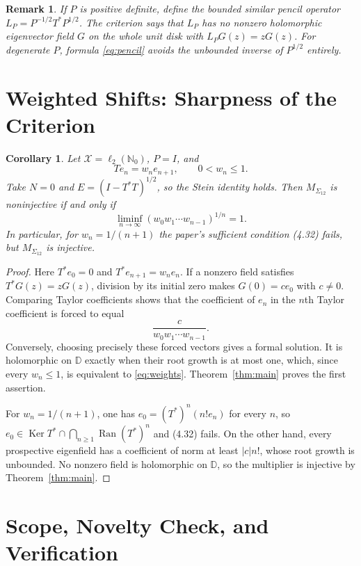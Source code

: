 \documentclass[11pt]{article}
\newtheorem{corollary}{Corollary}
\newtheorem{remark}{Remark}
\newcommand{\D}{\mathbb D}
\newcommand{\Ran}{\operatorname{Ran}}
\newcommand{\Ker}{\operatorname{Ker}}
\begin{document}
\begin{remark}
If $P$ is positive definite, define the bounded similar pencil operator
$L_P=P^{-1/2}T^*P^{1/2}$.  The criterion says that $L_P$ has no nonzero
holomorphic eigenvector field $G$ on the whole unit disk with
$L_PG(z)=zG(z)$.  For degenerate $P$, formula \eqref{eq:pencil} avoids the
unbounded inverse of $P^{1/2}$ entirely.
\end{remark}

\section*{Weighted Shifts: Sharpness of the Criterion}

\begin{corollary}\label{cor:shift}
Let $\mathcal X=\ell_2(\mathbb N_0)$, $P=I$, and
\[
 Te_n=w_ne_{n+1},\qquad 0<w_n\leq1.
\]
Take $N=0$ and $E=(I-T^*T)^{1/2}$, so the Stein identity holds.  Then
$M_{\Sigma_{12}}$ is noninjective if and only if
\begin{equation}\label{eq:weights}
 \liminf_{n\to\infty}(w_0w_1\cdots w_{n-1})^{1/n}=1.
\end{equation}
In particular, for $w_n=1/(n+1)$ the paper's sufficient condition (4.32)
fails, but $M_{\Sigma_{12}}$ is injective.
\end{corollary}

\begin{proof}
Here $T^*e_0=0$ and $T^*e_{n+1}=w_ne_n$.  If a nonzero field satisfies
$T^*G(z)=zG(z)$, division by its initial zero makes $G(0)=ce_0$ with
$c\neq0$.  Comparing Taylor coefficients shows that the coefficient of
$e_n$ in the $n$th Taylor coefficient is forced to equal
\[
 \frac{c}{w_0w_1\cdots w_{n-1}}.
\]
Conversely, choosing precisely these forced vectors gives a formal solution.
It is holomorphic on $\D$ exactly when their root growth is at most one,
which, since every $w_n\leq1$, is equivalent to \eqref{eq:weights}.
Theorem~\ref{thm:main} proves the first assertion.

For $w_n=1/(n+1)$, one has
$e_0=(T^*)^n(n!e_n)$ for every $n$, so
$e_0\in\Ker T^*\cap\bigcap_{n\geq1}\Ran(T^*)^n$ and (4.32) fails.  On the
other hand, every prospective eigenfield has a coefficient of norm at least
$|c|n!$, whose root growth is unbounded.  No nonzero field is holomorphic on
$\D$, so the multiplier is injective by Theorem~\ref{thm:main}.
\end{proof}

\section*{Scope, Novelty Check, and Verification}
\end{document}
